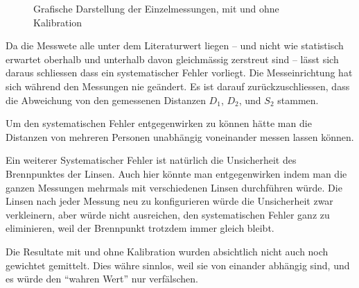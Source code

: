 \begin{figure}[ht!]
    \centering
    \caption{Grafische Darstellung der Einzelmessungen, mit und ohne Kalibration}
    \label{fig:einzelmessungen}
\end{figure}

Da die Messwete alle unter dem Literaturwert liegen -- und nicht wie statistisch
erwartet oberhalb und unterhalb davon gleichm\"assig  zerstreut  sind -- l\"asst
sich  daraus   schliessen   dass   ein   systematischer   Fehler  vorliegt.  Die
Messeinrichtung  hat sich w\"ahrend den Messungen nie ge\"andert. Es ist  darauf
zur\"uckzuschliessen, dass die  Abweichung  von  den gemessenen Distanzen $D_1$,
$D_2$, und $S_2$ stammen.

Um  den  systematischen  Fehler  entgegenwirken  zu  k\"onnen  h\"atte  man  die
Distanzen von mehreren Personen unabh\"angig voneinander messen lassen k\"onnen.

Ein  weiterer  Systematischer  Fehler  ist  nat\"urlich   die  Unsicherheit  des
Brennpunktes der Linsen. Auch hier k\"onnte  man  entgegenwirken  indem  man die
ganzen  Messungen  mehrmals  mit  verschiedenen  Linsen  durchf\"uhren  w\"urde.
Die Linsen nach jeder Messung neu zu konfigurieren w\"urde die Unsicherheit zwar
verkleinern,  aber  w\"urde nicht ausreichen, den systematischen Fehler ganz  zu
eliminieren, weil der Brennpunkt trotzdem immer gleich bleibt.

Die Resultate mit  und  ohne  Kalibration  wurden  absichtlich  nicht  auch noch
gewichtet  gemittelt.  Dies  w\"ahre sinnlos, weil sie von  einander  abh\"angig
sind, und es w\"urde den ``wahren Wert'' nur verf\"alschen.

